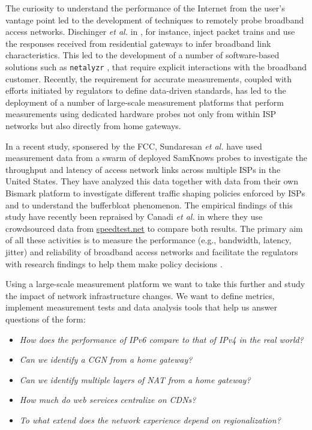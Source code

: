 The curiosity to understand the performance of the Internet from the user's
vantage point led to the development of techniques to remotely probe broadband
access networks. Dischinger \emph{et al.} in \cite{dischinger:2007}, for
instance, inject packet trains and use the responses received from residential
gateways to infer broadband link characteristics. This led to the development
of a number of software-based solutions such as \texttt{netalyzr}
\cite{kreibich:2010}, that require explicit interactions with the broadband
customer. Recently, the requirement for accurate measurements, coupled with
efforts initiated by regulators to define data-driven standards, has led to
the deployment of a number of large-scale measurement platforms that perform
measurements using dedicated hardware probes not only from within \ac{ISP}
networks but also directly from home gateways.

In a recent study, sponsered by the \ac{FCC}, Sundaresan \emph{et al.}
\cite{sundaresan:2011} have used measurement data from a swarm of deployed
SamKnows probes to investigate the throughput and latency of access network
links across multiple \ac{ISP}s in the United States. They have analyzed this
data together with data from their own Bismark platform \cite{sundaresan:2012}
to investigate different traffic shaping policies enforced by \ac{ISP}s and to
understand the bufferbloat phenomenon. The empirical findings of this study
have recently been repraised by Canadi \emph{et al.} in \cite{canadi:2012}
where they use crowdsourced data from \url{speedtest.net} to compare both
results. The primary aim of all these activities is to measure the performance
(e.g., bandwidth, latency, jitter) and reliability of broadband access
networks and facilitate the regulators with research findings to help them
make policy decisions \cite{draft-schulzrinne-lmap-requirements-00}.

Using a large-scale measurement platform we want to take this further and
study the impact of network infrastructure changes. We want to define metrics,
implement measurement tests and data analysis tools that help us answer
questions of the form:

\begin{itemize}
  \item \emph{How does the performance of IPv6 compare to that of IPv4 in the real world?}
  \item \emph{Can we identify a \ac{CGN} from a home gateway?}
  \item \emph{Can we identify multiple layers of NAT from a home gateway?}
  \item \emph{How much do web services centralize on \ac{CDN}s?}
  \item \emph{To what extend does the network experience depend on regionalization?}
\end{itemize}

